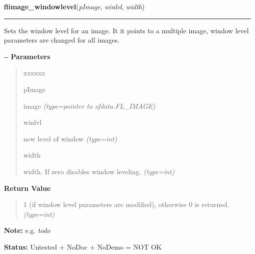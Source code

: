     \label{xformslib:flflimage:flimage_windowlevel}

    \vspace{0.5ex}

\hspace{.8\funcindent}\begin{boxedminipage}{\funcwidth}

    \raggedright \textbf{flimage\_windowlevel}(\textit{pImage}, \textit{winlvl}, \textit{width})

    \vspace{-1.5ex}

    \rule{\textwidth}{0.5\fboxrule}
\setlength{\parskip}{2ex}

Sets the window level for an image. It it points to a multiple image,
window level parameters are changed for all images.

-{}-
\setlength{\parskip}{1ex}
      \textbf{Parameters}
      \vspace{-1ex}

      \begin{quote}
        \begin{Ventry}{xxxxxx}

          \item[pImage]


image
            {\it (type=pointer to xfdata.FL\_IMAGE)}

          \item[winlvl]


new level of window
            {\it (type=int)}

          \item[width]


width. If zero disables window leveling.
            {\it (type=int)}

        \end{Ventry}

      \end{quote}

      \textbf{Return Value}
    \vspace{-1ex}

      \begin{quote}

1 (if window level parameters are modified), otherwise 0 is
returned.
      {\it (type=int)}

      \end{quote}

\textbf{Note:} 
e.g. \emph{todo}


\textbf{Status:} 
Untested + NoDoc + NoDemo = NOT OK


    \end{boxedminipage}

